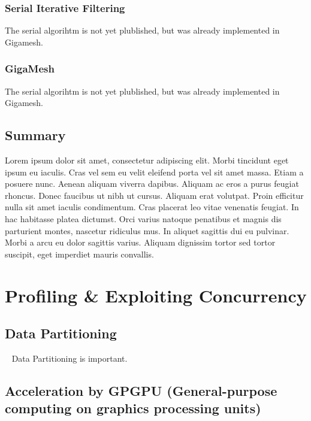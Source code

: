 \documentclass[openany]{book}
\begin{document}
\subsection{Serial Iterative Filtering}
The serial algorihtm is not yet plublished, but was already implemented in Gigamesh.

\subsection{GigaMesh}
The serial algorihtm is not yet plublished, but was already implemented in Gigamesh.



\section{Summary}
Lorem ipsum dolor sit amet, consectetur adipiscing elit. Morbi tincidunt eget 
ipsum eu iaculis. Cras vel sem eu velit eleifend porta vel sit amet massa. Etiam 
a posuere nunc. Aenean aliquam viverra dapibus. Aliquam ac eros a purus feugiat 
rhoncus. Donec faucibus ut nibh ut cursus. Aliquam erat volutpat. Proin efficitur 
nulla sit amet iaculis condimentum. Cras placerat leo vitae venenatis feugiat. In 
hac habitasse platea dictumst. Orci varius natoque penatibus et magnis dis 
parturient montes, nascetur ridiculus mus. In aliquet sagittis dui eu pulvinar. 
Morbi a arcu eu dolor sagittis varius. Aliquam dignissim tortor sed tortor 
suscipit, eget imperdiet mauris convallis.



\chapter{Profiling \& Exploiting Concurrency}
\section{Data Partitioning}~\cite[p.~357]{Lang17}
Data Partitioning is important.



\section[Acceleration by GPGPU]{Acceleration by GPGPU (General-purpose 
computing on graphics processing units)}
\end{document}
